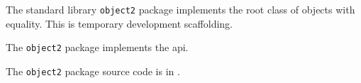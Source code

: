 
The standard library {\tt object2} package implements the root class of objects with equality.
This is temporary development scaffolding.

The {\tt object2} package implements the  api.

The {\tt object2} package source code is in .

